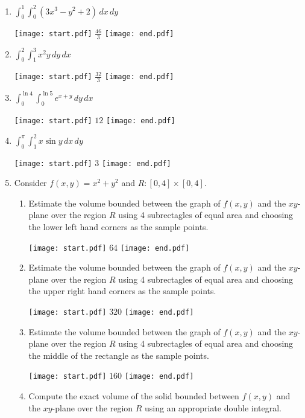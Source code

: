 \documentclass[12pt]{article}
\begin{document}
\begin{enumerate}

\item $\int_0^1\int_0^2\left(3x^3-y^2+2\right)\,dx\,dy$

\texttt{[image: start.pdf]}
{{$\frac{46}{3}$}}
\texttt{[image: end.pdf]}


\item $\int_0^2\int_1^3 x^2y\,dy\,dx$

\texttt{[image: start.pdf]}
{{$\frac{32}{3}$}}
\texttt{[image: end.pdf]}


\item $\int_0^{\ln{4}}\int_0^{\ln{5}}e^{x+y}\,dy\,dx$

\texttt{[image: start.pdf]}
{{$12$}}
\texttt{[image: end.pdf]}


\item $\int_0^{\pi} \int_1^2 x\sin{y} \,dx \,dy$

\texttt{[image: start.pdf]}
{{$3$}}
\texttt{[image: end.pdf]}


\newpage

\item Consider $f(x,y)=x^2+y^2$ and $R:[0,4]\times[0,4]$.

\begin{enumerate}

\item Estimate the volume bounded between the graph of $f(x,y)$ and the $xy$-plane over the region $R$ using 4 subrectagles of equal area and choosing the lower left hand corners as the sample points.

\texttt{[image: start.pdf]}
{{$64$}}
\texttt{[image: end.pdf]}


\item Estimate the volume bounded between the graph of $f(x,y)$ and the $xy$-plane over the region $R$ using 4 subrectagles of equal area and choosing the upper right hand corners as the sample points.

\texttt{[image: start.pdf]}
{{$320$}}
\texttt{[image: end.pdf]}


\item Estimate the volume bounded between the graph of $f(x,y)$ and the $xy$-plane over the region $R$ using 4 subrectagles of equal area and choosing the middle of the rectangle as the sample points.

\texttt{[image: start.pdf]}
{{$160$}}
\texttt{[image: end.pdf]}


\item Compute the exact volume of the solid bounded between $f(x,y)$ and the $xy$-plane over the region $R$ using an appropriate double integral.


\end{enumerate}
\end{enumerate}
\end{document}
